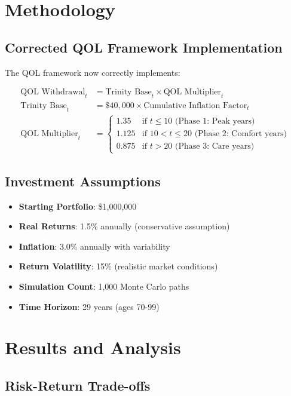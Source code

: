 \documentclass[11pt,letterpaper]{article}
\begin{document}
\section{Methodology}

\subsection{Corrected QOL Framework Implementation}

The QOL framework now correctly implements:

\begin{align}
\text{QOL Withdrawal}_t &= \text{Trinity Base}_t \times \text{QOL Multiplier}_t \\
\text{Trinity Base}_t &= \$40,000 \times \text{Cumulative Inflation Factor}_t \\
\text{QOL Multiplier}_t &= \begin{cases}
1.35 & \text{if } t \leq 10 \text{ (Phase 1: Peak years)} \\
1.125 & \text{if } 10 < t \leq 20 \text{ (Phase 2: Comfort years)} \\
0.875 & \text{if } t > 20 \text{ (Phase 3: Care years)}
\end{cases}
\end{align}

\subsection{Investment Assumptions}

\begin{itemize}
    \item \textbf{Starting Portfolio}: \$1,000,000
    \item \textbf{Real Returns}: 1.5\% annually (conservative assumption)
    \item \textbf{Inflation}: 3.0\% annually with variability
    \item \textbf{Return Volatility}: 15\% (realistic market conditions)
    \item \textbf{Simulation Count}: 1,000 Monte Carlo paths
    \item \textbf{Time Horizon}: 29 years (ages 70-99)
\end{itemize}

\section{Results and Analysis}

\subsection{Risk-Return Trade-offs}
\end{document}
